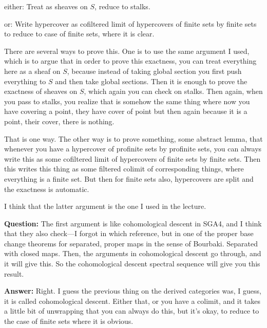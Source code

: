 either: Treat as sheaves on $S$, reduce to stalks.

or: Write hypercover as cofiltered limit of hypercovers of finite sets by finite sets to reduce to case of finite sets, where it is clear.

There are several ways to prove this. One is to use the same argument I used, which is to argue that in order to prove this exactness, you can treat everything here as a sheaf on $S$, because instead of taking global section you first push everything to $S$ and then take global sections. 
Then it is enough to prove the exactness of sheaves on $S$, which again you can check on stalks. 
Then again, when you pass to stalks, you realize that is somehow the same thing where now you have covering a point, they have cover of point but then again because it is a point, their cover, there is nothing.


That is one way. The other way is to prove something, some abstract lemma, that whenever you have a hypercover of profinite sets by profinite sets, you can always write this as some cofiltered limit of hypercovers of finite sets by finite sets. 
Then this writes this thing as some filtered colimit of corresponding things, where everything is a finite set. 
But then for finite sets also, hypercovers are split and the exactness is automatic.

I think that the latter argument is the one I used in the lecture. 

\textbf{Question:} The first argument is like cohomological descent in SGA4, and I think that they also check---I forgot in which reference, but in one of the proper base change theorems for separated, proper maps in the sense of Bourbaki. Separated with closed maps. 
Then, the arguments in cohomological descent go through, and it will give this. 
So the cohomological descent spectral sequence will give you this result. 

% 
\textbf{Answer:} Right. I guess the previous thing on the derived categories was, I guess, it is called cohomological descent. 
%
Either that, or you have a colimit, and it takes a little bit of unwrapping that you can always do this, but it's okay, to reduce to the case of finite sets where it is obvious.

